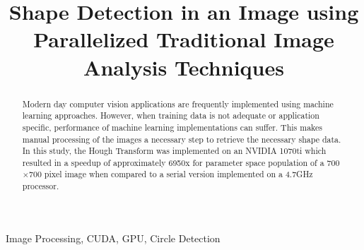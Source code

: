 \documentclass[conference]{IEEEtran}
\begin{document}
\title{Shape Detection in an Image using Parallelized Traditional Image Analysis Techniques\\
}

\author{
\and
}

\maketitle


\begin{IEEEkeywords}
Image Processing, CUDA, GPU, Circle Detection
\end{IEEEkeywords}

\begin{abstract}
Modern day computer vision applications are frequently implemented using machine learning approaches.
However, when training data is not adequate or application specific, performance of machine learning implementations can suffer.
This makes manual processing of the images a necessary step to retrieve the necessary shape data.
In this study, the Hough Transform was implemented on an NVIDIA 1070ti which resulted in a speedup of approximately 6950x for parameter space population of a 700$\times$700 pixel image when compared to a serial version implemented on a 4.7GHz processor. 
\end{abstract}


\end{document}

